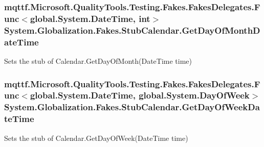 \hypertarget{class_system_1_1_globalization_1_1_fakes_1_1_stub_calendar_ac247943d9e1b891c2d7de2b96f21b39b}{
\subsubsection[{Get\-Day\-Of\-Month\-Date\-Time}]{\setlength{\rightskip}{0pt plus 5cm}mqttf.\-Microsoft.\-Quality\-Tools.\-Testing.\-Fakes.\-Fakes\-Delegates.\-Func$<$global.\-System.\-Date\-Time, int$>$ System.\-Globalization.\-Fakes.\-Stub\-Calendar.\-Get\-Day\-Of\-Month\-Date\-Time}}\label{class_system_1_1_globalization_1_1_fakes_1_1_stub_calendar_ac247943d9e1b891c2d7de2b96f21b39b}


Sets the stub of Calendar.\-Get\-Day\-Of\-Month(\-Date\-Time time)

\hypertarget{class_system_1_1_globalization_1_1_fakes_1_1_stub_calendar_a586a4f1d69ae679c566cecafaedd4fe7}{
\subsubsection[{Get\-Day\-Of\-Week\-Date\-Time}]{\setlength{\rightskip}{0pt plus 5cm}mqttf.\-Microsoft.\-Quality\-Tools.\-Testing.\-Fakes.\-Fakes\-Delegates.\-Func$<$global.\-System.\-Date\-Time, global.\-System.\-Day\-Of\-Week$>$ System.\-Globalization.\-Fakes.\-Stub\-Calendar.\-Get\-Day\-Of\-Week\-Date\-Time}}\label{class_system_1_1_globalization_1_1_fakes_1_1_stub_calendar_a586a4f1d69ae679c566cecafaedd4fe7}


Sets the stub of Calendar.\-Get\-Day\-Of\-Week(\-Date\-Time time)

